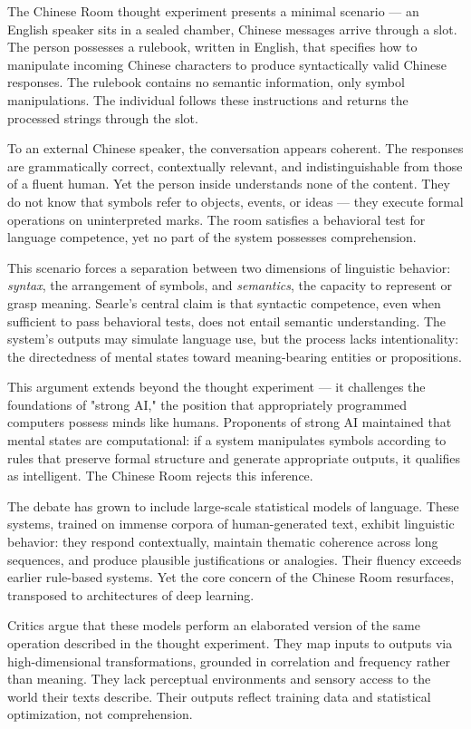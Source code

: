 The Chinese Room thought experiment presents a minimal scenario — an English speaker sits in a sealed chamber, Chinese messages arrive through a slot. The person possesses a rulebook, written in English, that specifies how to manipulate incoming Chinese characters to produce syntactically valid Chinese responses. The rulebook contains no semantic information, only symbol manipulations. The individual follows these instructions and returns the processed strings through the slot.

To an external Chinese speaker, the conversation appears coherent. The responses are grammatically correct, contextually relevant, and indistinguishable from those of a fluent human. Yet the person inside understands none of the content. They do not know that symbols refer to objects, events, or ideas — they execute formal operations on uninterpreted marks. The room satisfies a behavioral test for language competence, yet no part of the system possesses comprehension.

This scenario forces a separation between two dimensions of linguistic behavior: \textit{syntax}, the arrangement of symbols, and \textit{semantics}, the capacity to represent or grasp meaning. Searle's central claim is that syntactic competence, even when sufficient to pass behavioral tests, does not entail semantic understanding. The system's outputs may simulate language use, but the process lacks intentionality: the directedness of mental states toward meaning-bearing entities or propositions.

This argument extends beyond the thought experiment — it challenges the foundations of "strong AI," the position that appropriately programmed computers possess minds like humans. Proponents of strong AI maintained that mental states are computational: if a system manipulates symbols according to rules that preserve formal structure and generate appropriate outputs, it qualifies as intelligent. The Chinese Room rejects this inference.

The debate has grown to include large-scale statistical models of language. These systems, trained on immense corpora of human-generated text, exhibit linguistic behavior: they respond contextually, maintain thematic coherence across long sequences, and produce plausible justifications or analogies. Their fluency exceeds earlier rule-based systems. Yet the core concern of the Chinese Room resurfaces, transposed to architectures of deep learning.

Critics argue that these models perform an elaborated version of the same operation described in the thought experiment. They map inputs to outputs via high-dimensional transformations, grounded in correlation and frequency rather than meaning. They lack perceptual environments and sensory access to the world their texts describe. Their outputs reflect training data and statistical optimization, not comprehension.

